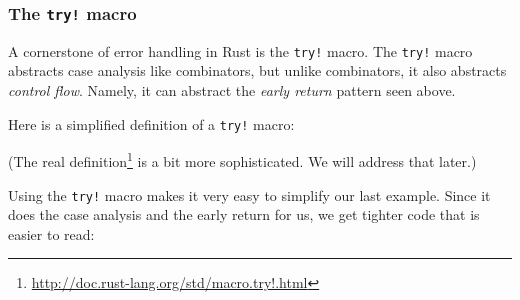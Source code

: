 \documentclass[a4paper,]{book}
\renewcommand*{\hypertarget}[3][\ar]{%
  \def\ar{#2}%
  \label{#1}%
  #3}
\newenvironment{Shaded}{\begin{snugshade}}{\end{snugshade}}
\newcommand{\KeywordTok}[1]{\textcolor[rgb]{0.13,0.29,0.53}{\textbf{{#1}}}}
\newcommand{\ConstantTok}[1]{\textcolor[rgb]{0.00,0.00,0.00}{{#1}}}
\newcommand{\PreprocessorTok}[1]{\textcolor[rgb]{0.56,0.35,0.01}{\textit{{#1}}}}
\newcommand{\NormalTok}[1]{{#1}}
\renewcommand{\href}[2]{#2\footnote{\url{#1}}}
\begin{document}
\hypertarget{the-try-macro}{\subsubsection{\texorpdfstring{The
\texttt{try!} macro}{The try! macro}}\label{the-try-macro}}

A cornerstone of error handling in Rust is the \texttt{try!} macro. The
\texttt{try!} macro abstracts case analysis like combinators, but unlike
combinators, it also abstracts \emph{control flow}. Namely, it can
abstract the \emph{early return} pattern seen above.

Here is a simplified definition of a \texttt{try!} macro:

\protect\hypertarget{code-try-def-simple}{}{}

\begin{Shaded}
\end{Shaded}

(The \href{http://doc.rust-lang.org/std/macro.try!.html}{real
definition} is a bit more sophisticated. We will address that later.)

Using the \texttt{try!} macro makes it very easy to simplify our last
example. Since it does the case analysis and the early return for us, we
get tighter code that is easier to read:
\end{document}
